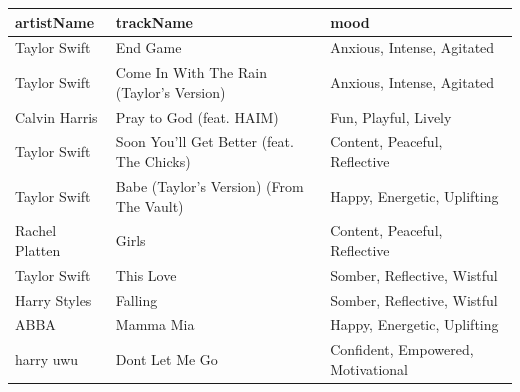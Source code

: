 \documentclass[
]{article}
\begin{document}
\begin{longtable}[t]{lll}
\toprule
artistName & trackName & mood\\
\midrule
Taylor Swift & End Game & Anxious, Intense, Agitated\\
Taylor Swift & Come In With The Rain (Taylor’s Version) & Anxious, Intense, Agitated\\
Calvin Harris & Pray to God (feat. HAIM) & Fun, Playful, Lively\\
Taylor Swift & Soon You’ll Get Better (feat. The Chicks) & Content, Peaceful, Reflective\\
Taylor Swift & Babe (Taylor's Version) (From The Vault) & Happy, Energetic, Uplifting\\
\addlinespace
Rachel Platten & Girls & Content, Peaceful, Reflective\\
Taylor Swift & This Love & Somber, Reflective, Wistful\\
Harry Styles & Falling & Somber, Reflective, Wistful\\
ABBA & Mamma Mia & Happy, Energetic, Uplifting\\
harry uwu & Dont Let Me Go & Confident, Empowered, Motivational\\
\bottomrule
\end{longtable}
\end{document}
